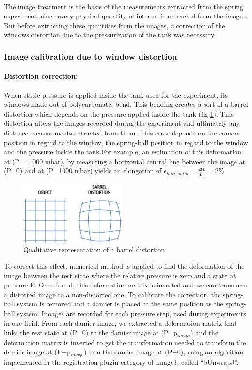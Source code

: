 \paragraph{}
 The image treatment is the basis of the measurements extracted from the spring experiment, since every physical quantity of interest is extracted from the images. But before extracting these quantities from the images, a correction of the windows distortion due to the pressurization of the tank was necessary.
\subsubsection{Image calibration due to window distortion}
\paragraph{Distortion correction:}
When static pressure is applied inside the tank used for the experiment, its windows made out of polycarbonate, bend. This bending creates a sort of a barrel distortion which depends on the pressure applied inside the tank (fig.\ref{fig:barrel_distortion}). This distortion alters the images recorded during the experiment and ultimately any distance measurements extracted from them. This error depends on the camera position in regard to the window, the spring-ball position in regard to the window and the pressure inside the tank.For example, an estimation of this deformation at (P = 1000 mbar), by measuring a horizontal central line between the image at (P=0) and at (P=1000 mbar) yields an elongation of $\epsilon_{horizontal} = \frac{\Delta L}{L_0} = 2\%$
\begin{figure}[H] %
	\centering%
  \includegraphics[width=0.48\textwidth]{figures/Chapter_1/barrel_effect.png}
	\caption{Qualitative representation of a barrel distortion}
	\label{fig:barrel_distortion}
\end{figure}
 To correct this effect, numerical method is applied to find the deformation of the image between the rest state where the relative pressure is zero and a state at pressure P. Once found, this deformation matrix is inverted and we can transform a distorted image to a non-distorted one.
To calibrate the correction, the spring-ball system is removed and a damier is placed at the same position as the spring-ball system. Iimages are recorded for each pressure step, used during experiments in one fluid.
 From each damier image, we extracted a deformation matrix that links the rest state at (P=0) to the damier image at (P=p$_{image}$) and the deformation matrix is inverted to get the transformation needed to transform the damier image at (P=p$_{image}$) into the damier image at (P=0), using an algorithm implemented in the registration plugin category of ImageJ, called "`bUnwrapJ"'.

